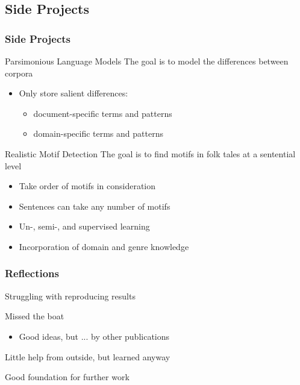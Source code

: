 \documentclass{beamer}
\begin{document}
\begin{frame}\section{Side Projects}
    \frametitle{Side Projects}

    \begin{block}{Parsimonious Language Models}
        The goal is to model the differences between corpora
        \begin{itemize}
            \item Only store salient differences:
                \begin{itemize}
                    \item document-specific terms and patterns
                    \item domain-specific terms and patterns
                \end{itemize}
        \end{itemize}
    \end{block}

    \begin{block}{Realistic Motif Detection}
        The goal is to find motifs in folk tales at a sentential level
        \begin{itemize}
            \item Take order of motifs in consideration
            \item Sentences can take any number of motifs
            \item Un-, semi-, and supervised learning
            \item Incorporation of domain and genre knowledge
        \end{itemize}
    \end{block}
\end{frame}

\begin{frame}
    \frametitle{Reflections}

    \begin{block}{Struggling with reproducing results}

    \end{block}

    \begin{block}{Missed the boat}
        \begin{itemize}
            \item Good ideas, but ... by other publications
        \end{itemize}
    \end{block}

    \begin{block}{}
        Little help from outside, but learned anyway

        Good foundation for further work
    \end{block}
\end{frame}
\end{document}

